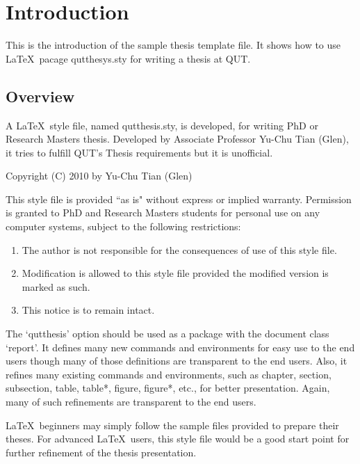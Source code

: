
\chapter[Introduction]{Introduction}
\label{cha:cha1Introduction}

This is the introduction of the sample thesis template file. It shows how to use \LaTeX~pacage qutthesys.sty for writing a thesis at QUT. 

\section{Overview}

A \LaTeX~style file, named qutthesis.sty, is developed, for writing PhD or Research Masters thesis. Developed by Associate Professor Yu-Chu Tian (Glen), it tries to fulfill QUT's Thesis requirements but it is unofficial. 
    
Copyright (C) 2010 by Yu-Chu Tian (Glen)
                                                                      
This style file is provided ``as is" without express or implied warranty. Permission is granted to PhD and Research Masters students for personal use on any computer systems, subject to the following restrictions:

\begin{enumerate}  
 \item The author is not responsible for the consequences of use of this style file.
 \item Modification is allowed to this style file provided the modified version is marked as such. 
 \item This notice is to remain intact.
\end{enumerate}   
    
    The `qutthesis' option should be used as a package with the document class `report'. It defines many new commands and environments for easy use to the end users though many of those definitions are transparent to the end users. Also, it refines many existing commands and environments, such as chapter, section, subsection, table, table*, figure, figure*, etc., for better presentation. Again, many of such refinements are transparent to the end users. 
    
    \LaTeX~beginners may simply follow the sample files provided to prepare their theses. For advanced \LaTeX ~users, this style file would be a good start point for further refinement of the thesis presentation. 
    
